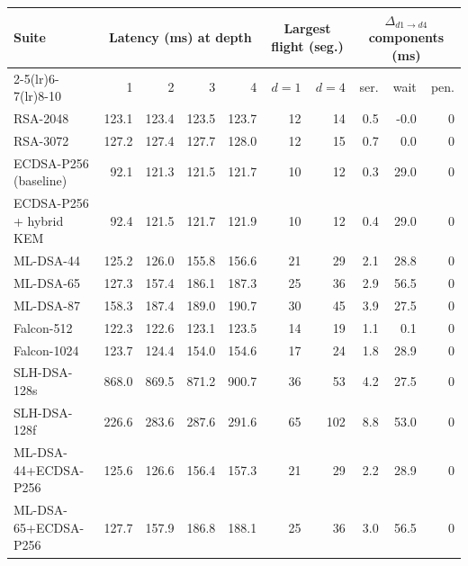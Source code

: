 \begin{tabular}{@{}lrrrrrrrrr@{}}
\toprule
Suite & \multicolumn{4}{c}{Latency (ms) at depth} & \multicolumn{2}{c}{Largest flight (seg.)} & \multicolumn{3}{c}{$\Delta_{d1\to d4}$ components (ms)} \\
\cmidrule(lr){2-5}\cmidrule(lr){6-7}\cmidrule(lr){8-10}
 & 1 & 2 & 3 & 4 & $d{=}1$ & $d{=}4$ & ser. & wait & pen. \\
\midrule
RSA-2048 & 123.1 & 123.4 & 123.5 & 123.7 & 12 & 14 & 0.5 & -0.0 & 0 \\
RSA-3072 & 127.2 & 127.4 & 127.7 & 128.0 & 12 & 15 & 0.7 & 0.0 & 0 \\
ECDSA-P256 (baseline) & 92.1 & 121.3 & 121.5 & 121.7 & 10 & 12 & 0.3 & 29.0 & 0 \\
ECDSA-P256 + hybrid KEM & 92.4 & 121.5 & 121.7 & 121.9 & 10 & 12 & 0.4 & 29.0 & 0 \\
ML-DSA-44 & 125.2 & 126.0 & 155.8 & 156.6 & 21 & 29 & 2.1 & 28.8 & 0 \\
ML-DSA-65 & 127.3 & 157.4 & 186.1 & 187.3 & 25 & 36 & 2.9 & 56.5 & 0 \\
ML-DSA-87 & 158.3 & 187.4 & 189.0 & 190.7 & 30 & 45 & 3.9 & 27.5 & 0 \\
Falcon-512 & 122.3 & 122.6 & 123.1 & 123.5 & 14 & 19 & 1.1 & 0.1 & 0 \\
Falcon-1024 & 123.7 & 124.4 & 154.0 & 154.6 & 17 & 24 & 1.8 & 28.9 & 0 \\
SLH-DSA-128s & 868.0 & 869.5 & 871.2 & 900.7 & 36 & 53 & 4.2 & 27.5 & 0 \\
SLH-DSA-128f & 226.6 & 283.6 & 287.6 & 291.6 & 65 & 102 & 8.8 & 53.0 & 0 \\
ML-DSA-44+ECDSA-P256 & 125.6 & 126.6 & 156.4 & 157.3 & 21 & 29 & 2.2 & 28.9 & 0 \\
ML-DSA-65+ECDSA-P256 & 127.7 & 157.9 & 186.8 & 188.1 & 25 & 36 & 3.0 & 56.5 & 0 \\
\bottomrule
\end{tabular}
